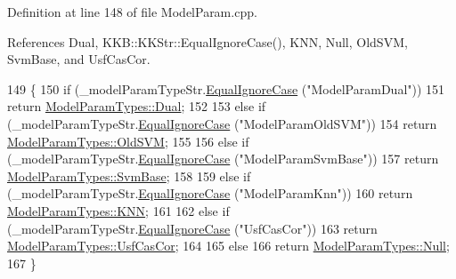 Definition at line 148 of file Model\+Param.\+cpp.



References Dual, K\+K\+B\+::\+K\+K\+Str\+::\+Equal\+Ignore\+Case(), K\+NN, Null, Old\+S\+VM, Svm\+Base, and Usf\+Cas\+Cor.


\begin{DoxyCode}
149 \{
150   \textcolor{keywordflow}{if}  (\_modelParamTypeStr.\hyperlink{class_k_k_b_1_1_k_k_str_a562f9696417c53f66bc4088eac072ab5}{EqualIgnoreCase} (\textcolor{stringliteral}{"ModelParamDual"}))
151     \textcolor{keywordflow}{return} \hyperlink{class_k_k_m_l_l_1_1_model_param_a5984a5fe225fdbe8e40fb5ec746a42d0acf53591af1208ddd535806600273099a}{ModelParamTypes::Dual};
152 
153   \textcolor{keywordflow}{else} \textcolor{keywordflow}{if}  (\_modelParamTypeStr.\hyperlink{class_k_k_b_1_1_k_k_str_a562f9696417c53f66bc4088eac072ab5}{EqualIgnoreCase} (\textcolor{stringliteral}{"ModelParamOldSVM"}))
154     \textcolor{keywordflow}{return} \hyperlink{class_k_k_m_l_l_1_1_model_param_a5984a5fe225fdbe8e40fb5ec746a42d0a7a3ee72cc2709227d58fd2c189a2a58b}{ModelParamTypes::OldSVM};
155 
156   \textcolor{keywordflow}{else} \textcolor{keywordflow}{if}  (\_modelParamTypeStr.\hyperlink{class_k_k_b_1_1_k_k_str_a562f9696417c53f66bc4088eac072ab5}{EqualIgnoreCase} (\textcolor{stringliteral}{"ModelParamSvmBase"}))
157     \textcolor{keywordflow}{return} \hyperlink{class_k_k_m_l_l_1_1_model_param_a5984a5fe225fdbe8e40fb5ec746a42d0ac59ef2743d310cad5d7bbb7b53773bb4}{ModelParamTypes::SvmBase};
158 
159   \textcolor{keywordflow}{else} \textcolor{keywordflow}{if}  (\_modelParamTypeStr.\hyperlink{class_k_k_b_1_1_k_k_str_a562f9696417c53f66bc4088eac072ab5}{EqualIgnoreCase} (\textcolor{stringliteral}{"ModelParamKnn"}))
160     \textcolor{keywordflow}{return} \hyperlink{class_k_k_m_l_l_1_1_model_param_a5984a5fe225fdbe8e40fb5ec746a42d0ab602e23c0ec2466f3aa6cade0cd5ce05}{ModelParamTypes::KNN};
161 
162   \textcolor{keywordflow}{else} \textcolor{keywordflow}{if}  (\_modelParamTypeStr.\hyperlink{class_k_k_b_1_1_k_k_str_a562f9696417c53f66bc4088eac072ab5}{EqualIgnoreCase} (\textcolor{stringliteral}{"UsfCasCor"}))
163     \textcolor{keywordflow}{return} \hyperlink{class_k_k_m_l_l_1_1_model_param_a5984a5fe225fdbe8e40fb5ec746a42d0ade699dc1790347a08d7060ab8078c71c}{ModelParamTypes::UsfCasCor};
164 
165   \textcolor{keywordflow}{else}
166     \textcolor{keywordflow}{return} \hyperlink{class_k_k_m_l_l_1_1_model_param_a5984a5fe225fdbe8e40fb5ec746a42d0abbb93ef26e3c101ff11cdd21cab08a94}{ModelParamTypes::Null};
167 \}
\end{DoxyCode}
